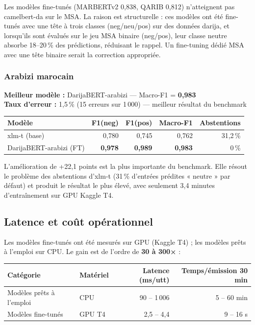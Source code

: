 \documentclass[12pt, a4paper]{article}
\begin{document}
Les modèles fine-tunés (MARBERTv2 0{,}838, QARIB 0{,}812) n'atteignent pas
camelbert-da sur le MSA. La raison est structurelle : ces modèles ont été
fine-tunés avec une tête à trois classes (neg/neu/pos) sur des données darija,
et lorsqu'ils sont évalués sur le jeu MSA binaire (neg/pos), leur classe
neutre absorbe 18--20\,\% des prédictions, réduisant le rappel. Un fine-tuning
dédié MSA avec une tête binaire serait la correction appropriée.

\subsubsection{Arabizi marocain}

\begin{resultbox}
\textbf{Meilleur modèle :} DarijaBERT-arabizi — Macro-F1 = \textbf{0{,}983}\\
\textbf{Taux d'erreur :} 1{,}5\,\% (15 erreurs sur 1\,000) — meilleur résultat du benchmark
\end{resultbox}

\begin{center}
\begin{tabular}{lrrrr}
\toprule
\textbf{Modèle} & \textbf{F1(neg)} & \textbf{F1(pos)} & \textbf{Macro-F1} & \textbf{Abstentions} \\
\midrule
xlm-t (base)            & 0{,}780 & 0{,}745 & 0{,}762 & 31{,}2\,\% \\
DarijaBERT-arabizi (FT) & \textbf{0{,}978} & \textbf{0{,}989} & \textbf{0{,}983} & 0\,\% \\
\bottomrule
\end{tabular}
\end{center}

L'amélioration de +22{,}1 points est la plus importante du benchmark. Elle
résout le problème des abstentions d'xlm-t (31\,\% d'entrées prédites
« neutre » par défaut) et produit le résultat le plus élevé, avec seulement
3,4 minutes d'entraînement sur GPU Kaggle T4.

\subsection{Latence et coût opérationnel}

Les modèles fine-tunés ont été mesurés sur GPU (Kaggle T4) ; les modèles
prêts à l'emploi sur CPU. Le gain est de l'ordre de \textbf{30 à 300×} :

\begin{center}
\begin{tabular}{llrr}
\toprule
\textbf{Catégorie} & \textbf{Matériel} & \textbf{Latence (ms/utt)} &
\textbf{Temps/émission 30 min} \\
\midrule
Modèles prêts à l'emploi & CPU & 90 -- 1\,006 & 5 -- 60 min \\
Modèles fine-tunés & GPU T4 & 2{,}5 -- 4{,}4 & 9 -- 16 s \\
\bottomrule
\end{tabular}
\end{center}
\end{document}
